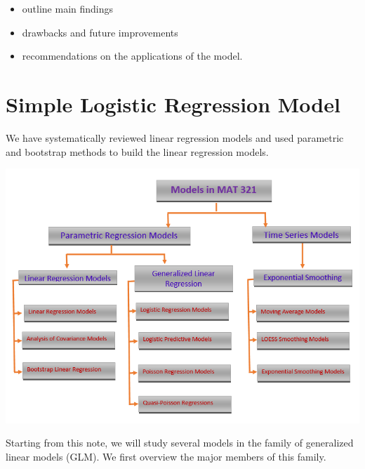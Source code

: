 \documentclass[
]{book}
\providecommand{\tightlist}{%
  \setlength{\itemsep}{0pt}\setlength{\parskip}{0pt}}
\begin{document}
\begin{itemize}
  \begin{itemize}
  \tightlist
  \item
    outline main findings
  \item
    drawbacks and future improvements
  \item
    recommendations on the applications of the model.
  \end{itemize}
\end{itemize}

\hypertarget{simple-logistic-regression-model}{%
\chapter{Simple Logistic Regression Model}\label{simple-logistic-regression-model}}

We have systematically reviewed linear regression models and used parametric and bootstrap methods to build the linear regression models.

\hfill\break

\begin{center}\includegraphics[width=0.95\linewidth]{img06/w06-ModelSummary4MAT321} \end{center}

\hfill\break

Starting from this note, we will study several models in the family of generalized linear models (GLM). We first overview the major members of this family.

\hfill\break
\end{document}
